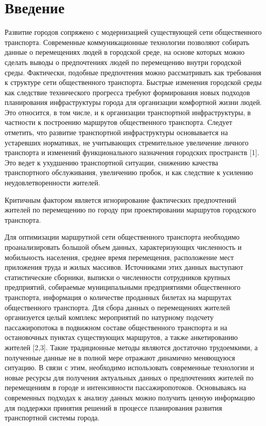 \part{Введение}

Развитие городов сопряжено с модернизацией существующей сети общественного транспорта. Современные 
коммуникационные технологии позволяют собирать данные о перемещениях людей в городской среде, на основе 
которых можно сделать выводы о предпочтениях людей по перемещению внутри городской среды. Фактически, 
подобные предпочтения можно рассматривать как требования к структуре сети общественного транспорта. 
Быстрые изменения городской среды как следствие технического прогресса требуют формирования новых 
подходов планирования инфраструктуры города для организации комфортной жизни людей. Это относится, в том 
числе, и к организации транспортной инфраструктуры, в частности к построению маршрутов общественного 
транспорта. Следует отметить, что развитие транспортной инфраструктуры основывается на устаревших 
нормативах, не учитывающих стремительное увеличение личного транспорта и изменений функционального 
назначения городских пространств [1]. Это ведет к ухудшению транспортной ситуации, снижению качества 
транспортного обслуживания, увеличению пробок, и как следствие к усилению неудовлетворенности жителей. 

Критичным фактором является игнорирование фактических предпочтений жителей по перемещению по городу при 
проектировании маршрутов городского транспорта. 

Для оптимизации маршрутной сети общественного транспорта необходимо проанализировать большой объем данных, 
характеризующих численность и мобильность населения, среднее время перемещения, расположение мест приложения 
труда и жилых массивов. Источниками этих данных выступают статистические сборники, выписки о численности 
сотрудников крупных предприятий, собираемые муниципальными предприятиями общественного транспорта, 
информация о количестве проданных билетах на маршрутах общественного транспорта. Для сбора данных о 
перемещениях жителей организуется целый комплекс мероприятий по натурному подсчету пассажиропотока в 
подвижном составе общественного транспорта и на остановочных пунктах существующих маршрутов, а также 
анкетированию жителей [2,3]. Такие традиционные методы являются достаточно трудоемкими, а полученные 
данные не в полной мере отражают динамично меняющуюся ситуацию. В связи с этим, необходимо использовать 
современные технологии и новые ресурсы для получения актуальных данных о предпочтениях жителей по 
перемещениям в городе и интенсивности пассажиропотоков. Основываясь на современных подходах к анализу 
данных можно получить ценную информацию для поддержки принятия решений в процессе планирования развития 
транспортной системы города. 


